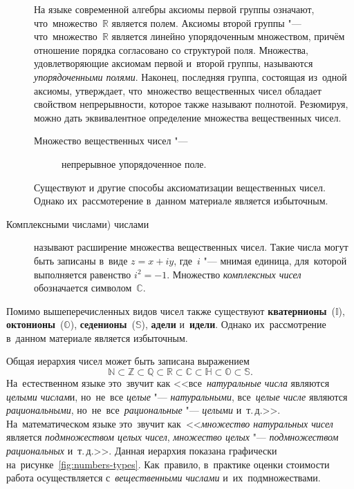 \documentclass[]{scrartcl}
\begin{document}
\begin{description}
	На языке современной алгебры аксиомы первой группы означают, что~множество~${\displaystyle \mathbb {R} }$ является полем. Аксиомы второй группы "--- что~множество~${\displaystyle \mathbb {R} }$ является линейно упорядоченным множеством, причём отношение порядка согласовано со структурой поля. Множества, удовлетворяющие аксиомам первой и~второй группы, называются \emph{упорядоченными полями}. Наконец, последняя группа, состоящая из~одной аксиомы, утверждает, что~множество вещественных чисел обладает свойством непрерывности, которое также называют полнотой. Резюмируя, можно дать эквивалентное определение множества вещественных чисел.
	\begin{description}
		\item[Множество вещественных чисел "---] непрерывное упорядоченное поле.
	\end{description} 
	Существуют и другие способы аксиоматизации вещественных чисел. Однако их~рассмотерение в~данном материале является избыточным.
	\item[Комплексными числами) числами] называют расширение множества вещественных чисел. Такие числа могут быть записаны в~виде $z=x+iy$, где~$i$ "--- мнимая единица, для~которой выполняется равенство $i^2=-1$. Множество \emph{комплексных чисел} обозначается символом~$\mathbb{C}$. 
\end{description} 
Помимо вышеперечисленных видов чисел также существуют \textbf{кватернионы}~($\mathbb{I}$), \textbf{октонионы}~($\mathbb{O}$), \textbf{седенионы}~($\mathbb{S}$), \textbf{адели} и~\textbf{идели}. Однако их~рассмотрение в~данном материале является избыточным. 

Общая иерархия чисел может быть записана выражением
\begin{equation}\label{eq:numbers-hierarchy}
\mathbb{N} \subset \mathbb{Z} \subset \mathbb{Q} \subset \mathbb{R} \subset \mathbb{C} \subset \mathbb{H} \subset \mathbb{O} \subset \mathbb{S}.
\end{equation}
На~естественном языке это~звучит как <<все~\emph{натуральные числа} являются \emph{целыми числам}и, но~не~все \emph{целые} "--- \emph{натуральными}, все~\emph{целые числе} являются \emph{рациональными}, но~не~все~\emph{рациональные} "--- \emph{целыми} и~т.\,д.>>. На~математическом языке это~звучит как~<<\emph{множество натуральных чисел} является \emph{подмножеством целых чисел}, \emph{множество целых} "--- \emph{подмножеством рациональных} и~т.\,д.>>. Данная иерархия показана графически на~рисунке~\ref{fig:numbers-types}. Как~правило, в~практике оценки стоимости работа осуществляется с~\emph{вещественными числами} и~их~подмножествами.
\end{document}
